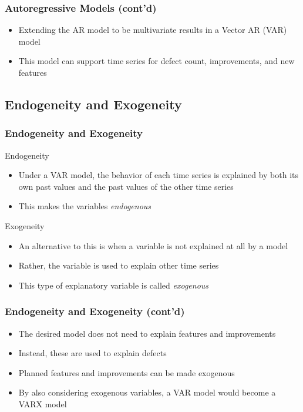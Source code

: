 \documentclass[presentation]{beamer}
\begin{document}
\begin{frame}[t]
\frametitle{Autoregressive Models (cont'd)}
\begin{itemize}
\item{Extending the AR model to be multivariate results in a Vector AR (VAR) model}
\item{This model can support time series for defect count, improvements, and new features}
\end{itemize}
\end{frame}

\subsection{Endogeneity and Exogeneity}

\begin{frame}[t]
\frametitle{Endogeneity and Exogeneity}

\large{Endogeneity}
\begin{itemize}
\item{Under a VAR model, the behavior of each time series is explained by both its own past values and the past values of the other time series}
\item{This makes the variables \textit{endogenous}}
\end{itemize}

\large{Exogeneity}
\begin{itemize}
\item{An alternative to this is when a variable is not explained at all by a model}
\item{Rather, the variable is used to explain other time series}
\item{This type of explanatory variable is called \textit{exogenous}}
\end{itemize}

\end{frame}

\begin{frame}[t]
\frametitle{Endogeneity and Exogeneity (cont'd)}
\begin{itemize}
\item{The desired model does not need to explain features and improvements}
\item{Instead, these are used to explain defects}
\item{Planned features and improvements can be made exogenous}
\item{By also considering exogenous variables, a VAR model would become a
VARX model}
\end{itemize}
\end{frame}
\end{document}
